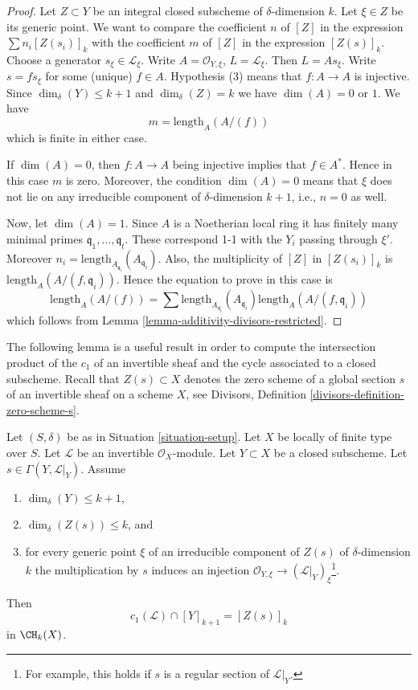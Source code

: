 \begin{proof}
Let $Z \subset Y$ be an integral closed subscheme of
$\delta$-dimension $k$. Let $\xi \in Z$ be its generic point.
We want to compare the coefficient $n$ of $[Z]$ in the expression
$\sum n_i[Z(s_i)]_k$ with the coefficient $m$ of $[Z]$ in the
expression $[Z(s)]_k$. Choose a generator $s_\xi \in \mathcal{L}_\xi$.
Write $A = \mathcal{O}_{Y, \xi}$, $L = \mathcal{L}_\xi$.
Then $L = As_\xi$. Write $s = f s_\xi$ for some (unique) $f \in A$.
Hypothesis (3) means that $f : A \to A$ is injective.
Since $\dim_\delta(Y) \leq k + 1$ and $\dim_\delta(Z) = k$
we have $\dim(A) = 0$ or $1$. We have
$$
m = \text{length}_A(A/(f))
$$
which is finite in either case.

\medskip\noindent
If $\dim(A) = 0$, then $f : A \to A$ being injective
implies that $f \in A^*$. Hence in this case $m$ is zero.
Moreover, the condition $\dim(A) = 0$ means that $\xi$
does not lie on any irreducible component of $\delta$-dimension
$k + 1$, i.e., $n = 0$ as well.

\medskip\noindent
Now, let $\dim(A) = 1$.
Since $A$ is a Noetherian local ring it has finitely
many minimal primes $\mathfrak q_1, \ldots, \mathfrak q_t$.
These correspond 1-1 with the $Y_i$ passing through $\xi'$.
Moreover $n_i = \text{length}_{A_{\mathfrak q_i}}(A_{\mathfrak q_i})$.
Also, the multiplicity of $[Z]$ in $[Z(s_i)]_k$ is
$\text{length}_A(A/(f, \mathfrak q_i))$.
Hence the equation to prove in this case is
$$
\text{length}_A(A/(f))
=
\sum \text{length}_{A_{\mathfrak q_i}}(A_{\mathfrak q_i})
\text{length}_A(A/(f, \mathfrak q_i))
$$
which follows from
Lemma \ref{lemma-additivity-divisors-restricted}.
\end{proof}

\noindent
The following lemma is a useful result in order to compute the intersection
product of the $c_1$ of an invertible sheaf and the cycle associated
to a closed subscheme.
Recall that $Z(s) \subset X$ denotes the zero scheme of a global section
$s$ of an invertible sheaf on a scheme $X$, see
Divisors, Definition \ref{divisors-definition-zero-scheme-s}.

\begin{lemma}
\label{lemma-geometric-cap}
Let $(S, \delta)$ be as in Situation \ref{situation-setup}.
Let $X$ be locally of finite type over $S$.
Let $\mathcal{L}$ be an invertible $\mathcal{O}_X$-module.
Let $Y \subset X$ be a closed subscheme.
Let $s \in \Gamma(Y, \mathcal{L}|_Y)$.
Assume
\begin{enumerate}
\item $\dim_\delta(Y) \leq k + 1$,
\item $\dim_\delta(Z(s)) \leq k$, and
\item for every generic point $\xi$ of an irreducible component of
$Z(s)$ of $\delta$-dimension $k$ the multiplication by $s$
induces an injection
$\mathcal{O}_{Y, \xi} \to (\mathcal{L}|_Y)_\xi$\footnote{For example,
this holds if $s$ is a regular section of $\mathcal{L}|_Y$.}.
\end{enumerate}
Then
$$
c_1(\mathcal{L}) \cap [Y]_{k + 1} = [Z(s)]_k
$$
in $\CH_k(X)$.
\end{lemma}

